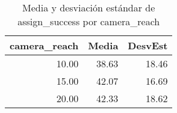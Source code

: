 \begin{table}
\caption{Media y desviación estándar de assign\_success por camera_reach}
\label{tab:camera_reach-stats}
\begin{tabular}{rrr}
\toprule
camera_reach & Media & DesvEst \\
\midrule
10.00 & 38.63 & 18.46 \\
15.00 & 42.07 & 16.69 \\
20.00 & 42.33 & 18.62 \\
\bottomrule
\end{tabular}
\end{table}
